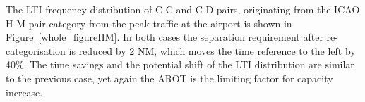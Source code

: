 

The LTI frequency distribution of C-C and C-D pairs, originating from the ICAO H-M pair category from the peak traffic at the airport is shown in Figure~\ref{whole_figureHM}. In both cases the separation requirement after re-categorisation is reduced by 2 NM, which moves the time reference to the left by 40\%. The time savings and the potential shift of the LTI distribution are similar to the previous case, yet again the AROT is the limiting factor for capacity increase.
 
